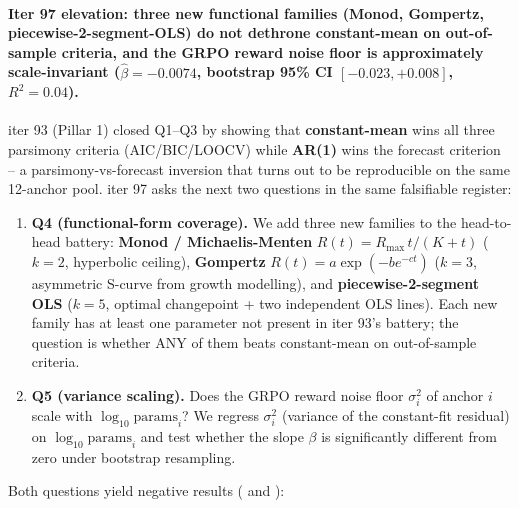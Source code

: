 \paragraph{Iter 97 elevation: three new functional families (Monod,
Gompertz, piecewise-2-segment-OLS) do not dethrone constant-mean on
out-of-sample criteria, and the GRPO reward noise floor is
approximately scale-invariant ($\hat\beta = -0.0074$, bootstrap 95\% CI
$[-0.023, +0.008]$, $R^2 = 0.04$).}
\label{par:scaling-iter97}

iter 93 (Pillar 1) closed Q1--Q3 by showing that \textbf{constant-mean}
wins all three parsimony criteria (AIC/BIC/LOOCV) while \textbf{AR(1)}
wins the forecast criterion -- a parsimony-vs-forecast inversion that
turns out to be reproducible on the same 12-anchor pool.
iter 97 asks the next two questions in the same falsifiable register:

\begin{enumerate}
\item \textbf{Q4 (functional-form coverage).}  We add three new
families to the head-to-head battery: \textbf{Monod / Michaelis-Menten}
$R(t) = R_\mathrm{max}\, t / (K + t)$ ($k=2$, hyperbolic ceiling),
\textbf{Gompertz} $R(t) = a \exp(-b e^{-c t})$ ($k=3$, asymmetric
S-curve from growth modelling), and \textbf{piecewise-2-segment OLS}
($k=5$, optimal changepoint + two independent OLS lines).  Each new
family has at least one parameter not present in iter 93's battery; the
question is whether ANY of them beats constant-mean on
out-of-sample criteria.
\item \textbf{Q5 (variance scaling).}  Does the GRPO reward noise
floor $\sigma^2_i$ of anchor $i$ scale with $\log_{10} \mathrm{params}_i$?
We regress $\sigma^2_i$ (variance of the constant-fit residual) on
$\log_{10} \mathrm{params}_i$ and test whether the slope $\beta$ is
significantly different from zero under bootstrap resampling.
\end{enumerate}

Both questions yield negative results
( and
):

